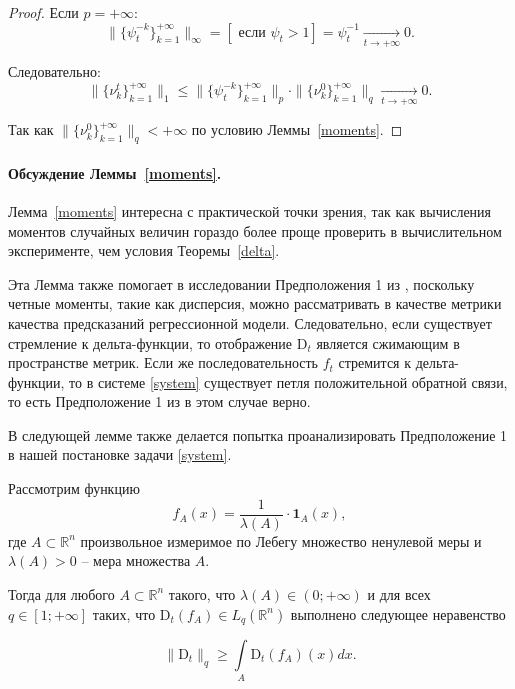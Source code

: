 \begin{proof}
            Если $p = +\infty$:
            \begin{equation*}
                \|\{\psi_t^{-k}\}_{k=1}^{+\infty}\|_{\infty} = \left[ \text{ если } \psi_t > 1 \right] = \psi_t^{-1} \underset{t \to +\infty}{\longrightarrow} 0.
            \end{equation*}
            
            Следовательно: 
            \begin{equation*}
                \|\{\nu_k^t\}_{k=1}^{+\infty}\|_1 \leq \|\{\psi_t^{-k}\}_{k=1}^{+\infty}\|_p \cdot \|\{\nu_k^0\}_{k=1}^{+\infty}\|_q \underset{t \to +\infty}{\longrightarrow} 0.
            \end{equation*}
            
            Так как $\|\{\nu_k^0\}_{k=1}^{+\infty}\|_q < +\infty$ по условию Леммы~\ref{moments}.
        \end{proof}
    
        \paragraph{Обсуждение Леммы~\ref{moments}.} Лемма~\ref{moments} интересна с практической точки зрения, так как вычисления моментов случайных величин гораздо более проще проверить в вычислительном эксперименте, чем условия Теоремы~\ref{delta}. 
    
        Эта Лемма также помогает в исследовании Предположения 1 из \citep{khritankov2021hidden}, поскольку четные моменты, такие как дисперсия, можно рассматривать в качестве метрики качества предсказаний регрессионной модели. Следовательно, если существует стремление к дельта-функции, то отображение $\text{D}_t$ является сжимающим в пространстве метрик. Если же последовательность $f_t$ стремится к дельта-функции, то в системе \eqref{system} существует петля положительной обратной связи, то есть Предположение 1 из \cite{khritankov2021hidden} в этом случае верно.
    
        В следующей лемме также делается попытка проанализировать Предположение 1 в нашей постановке задачи \eqref{system}.
    
        \begin{lemma} \label{ineq_q}
            Рассмотрим функцию
            \begin{equation*}
                f_A(x) = \dfrac{1}{\lambda(A)} \cdot \textbf{1}_{A}(x),
            \end{equation*}
            где $A \subset \mathbb{R}^n$ произвольное измеримое по Лебегу множество ненулевой меры и $\lambda(A) > 0$ -- мера множества $A$.
    
            Тогда для любого $A \subset \mathbb{R}^n$ такого, что $\lambda(A) \in (0; +\infty)$ и для всех $q \in [1; +\infty]$ таких, что $\text{D}_t(f_A) \in L_q(\mathbb{R}^n)$ выполнено следующее неравенство
    
            \begin{equation*}
                \|\text{D}_t\|_q \geq \int\limits_{A} \text{D}_t(f_A)(x)dx.
            \end{equation*}
        \end{lemma}

